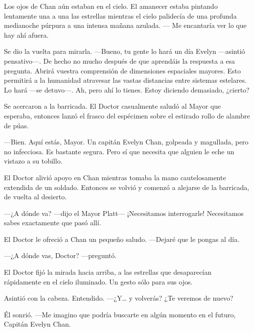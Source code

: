 Los ojos de Chan aún estaban en el cielo. El amanecer estaba pintando
lentamente una a una las estrellas mientras el cielo palidecía de una
profunda medianoche púrpura a una intensa mañana azulada. --- Me
encantaría ver lo que hay ahí afuera.

Se dio la vuelta para mirarla. ---Bueno, tu gente lo hará un día Evelyn
---asintió pensativo---. De hecho no mucho después de que aprendáis la
respuesta a esa pregunta. Abrirá vuestra comprensión de dimensiones
espaciales mayores. Esto permitirá a la humanidad atravesar las vastas
distancias entre sistemas estelares. Lo hará ---se detuvo---. Ah, pero
ahí lo tienes. Estoy diciendo demasiado, ¿cierto?

Se acercaron a la barricada. El Doctor casualmente saludó al Mayor que
esperaba, entonces lanzó el frasco del espécimen sobre el estirado rollo
de alambre de púas.

---Bien. Aquí estás, Mayor. Un capitán Evelyn Chan, golpeada y
magullada, pero no infecciosa. Es bastante segura. Pero sí que necesita
que alguien le eche un vistazo a su tobillo.

El Doctor alivió apoyo en Chan mientras tomaba la mano cautelosamente
extendida de un soldado. Entonces se volvió y comenzó a alejarse de la
barricada, de vuelta al desierto.

---¿A dónde va? ---dijo el Mayor Platt--- ¡Necesitamos interrogarle!
Necesitamos sabes exactamente que pasó allí.

El Doctor le ofreció a Chan un pequeño saludo. ---Dejaré que le pongas
al día.

---¿A dónde vas, Doctor? ---preguntó.

El Doctor fijó la mirada hacia arriba, a las estrellas que desaparecían
rápidamente en el cielo iluminado. Un gesto sólo para sus ojos.

Asintió con la cabeza. Entendido. ---¿Y\ldots{} y volverás? ¿Te veremos
de nuevo?

Él sonrió. ---Me imagino que podría buscarte en algún momento en el
futuro, Capitán Evelyn Chan.